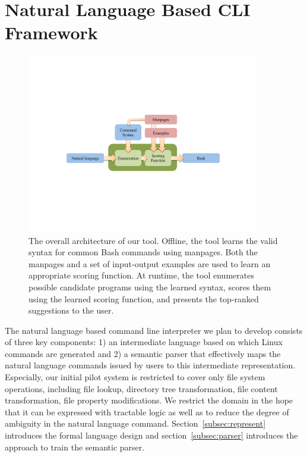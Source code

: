 \section{Natural Language Based CLI Framework}

\begin{figure}[h]
    \begin{center} \includegraphics[width=4in]{architecture.pdf} \end{center}
    \caption{The overall architecture of our tool. Offline, the tool learns the
        valid syntax for common Bash commands using manpages. Both the manpages
        and a set of input-output examples are used to learn an appropriate
        scoring function. At runtime, the tool enumerates possible candidate
        programs using the learned syntax, scores them using the learned scoring
        function, and presents the top-ranked suggestions to the user.}
    \label{fig:arch}
\end{figure}

The natural language based command line interpreter we plan to develop consists of three key components: 1) an intermediate language  based on which Linux commands are generated and
2) a semantic parser that effectively maps the natural language commands issued by users to this intermediate representation. Especially, our initial pilot system is restricted to cover only file system operations, including file lookup, directory tree transformation, file content transformation, file property modifications. We restrict the domain in the hope that it can be expressed with tractable logic as well as to reduce the degree of ambiguity in the natural language command. Section~\ref{subsec:represent} introduces the formal language design and section~\ref{subsec:parser} introduces the approach to train the semantic parser.

